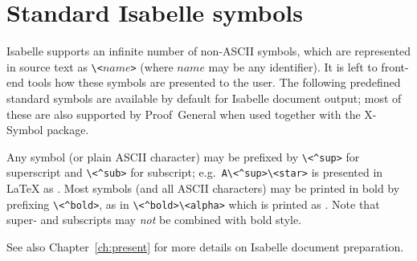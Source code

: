 

\chapter{Standard Isabelle symbols}\label{app:symbols}

Isabelle supports an infinite number of non-ASCII symbols, which are
represented in source text as \verb,\<,$name$\verb,>, (where $name$ may be any
identifier).  It is left to front-end tools how these symbols are presented to
the user.  The following predefined standard symbols are available by default
for Isabelle document output; most of these are also supported by
Proof~General when used together with the X-Symbol package.

Any symbol (or plain ASCII character) may be prefixed by \verb,\<^sup>, for
superscript and \verb,\<^sub>, for subscript; e.g.\ \verb,A\<^sup>\<star>, is
presented in {\LaTeX} as .  Most symbols (and
all ASCII characters) may be printed in bold by prefixing \verb,\<^bold>,, as
in \verb,\<^bold>\<alpha>, which is printed as
\isa{\isactrlbold{\isasymalpha}}.  Note that super- and subscripts may
\emph{not} be combined with bold style.

See also Chapter~\ref{ch:present} for more details on Isabelle document
preparation.

\begin{center}
  \begin{isabellebody}
      
  \end{isabellebody}
\end{center}

